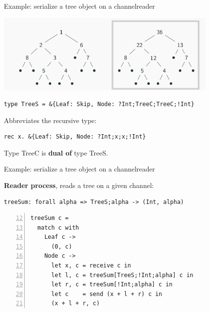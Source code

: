 \documentclass[10pt]{beamer}
\begin{document}
\begin{frame}[fragile]{Example:  serialize a tree object on a channel\hfill{\color{mLightBrown}reader}}

\includegraphics[width=11cm]{img/treesumR}
\pause

\begin{lstlisting}
type TreeS = &{Leaf: Skip, Node: ?Int;TreeC;TreeC;!Int}
\end{lstlisting}
Abbreviates the recursive type:
\begin{lstlisting}
rec x. &{Leaf: Skip, Node: ?Int;x;x;!Int}
\end{lstlisting}

\pause
\centering
\begin{tcolorbox}
	Type TreeC is \textbf{dual of} type TreeS.
\end{tcolorbox}

\end{frame}



\begin{frame}[fragile]{Example:  serialize a tree object on a channel\hfill{\color{mLightBrown}reader}}

\textbf{Reader process}, reads a tree on a given channel:
	
\begin{lstlisting}
treeSum: forall alpha => TreeS;alpha -> (Int, alpha)
\end{lstlisting}

\label{lst:treeSum}
\begin{lstlisting}[numbers=left,firstnumber=12, xleftmargin=0.7cm]
treeSum c =
  match c with
    Leaf c ->
      (0, c)
    Node c ->
      let x, c = receive c in
      let l, c = treeSum[TreeS;!Int;alpha] c in
      let r, c = treeSum[!Int;alpha] c in
      let c    = send (x + l + r) c in
      (x + l + r, c)
\end{lstlisting}
\end{frame}
\end{document}

